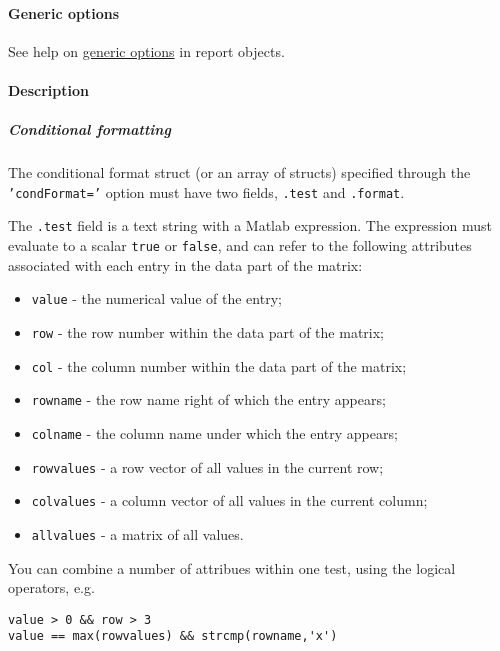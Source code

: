 \paragraph{Generic options}\label{generic-options}

See help on \href{report/Contents}{generic options} in report objects.

\paragraph{Description}\label{description}

\subparagraph{Conditional formatting}\label{conditional-formatting}

The conditional format struct (or an array of structs) specified through
the \texttt{'condFormat='} option must have two fields, \texttt{.test}
and \texttt{.format}.

The \texttt{.test} field is a text string with a Matlab expression. The
expression must evaluate to a scalar \texttt{true} or \texttt{false},
and can refer to the following attributes associated with each entry in
the data part of the matrix:

\begin{itemize}
\itemsep1pt\parskip0pt
\item
  \texttt{value} - the numerical value of the entry;
\item
  \texttt{row} - the row number within the data part of the matrix;
\item
  \texttt{col} - the column number within the data part of the matrix;
\item
  \texttt{rowname} - the row name right of which the entry appears;
\item
  \texttt{colname} - the column name under which the entry appears;
\item
  \texttt{rowvalues} - a row vector of all values in the current row;
\item
  \texttt{colvalues} - a column vector of all values in the current
  column;
\item
  \texttt{allvalues} - a matrix of all values.
\end{itemize}

You can combine a number of attribues within one test, using the logical
operators, e.g.

\begin{verbatim}
value > 0 && row > 3
value == max(rowvalues) && strcmp(rowname,'x')
\end{verbatim}

